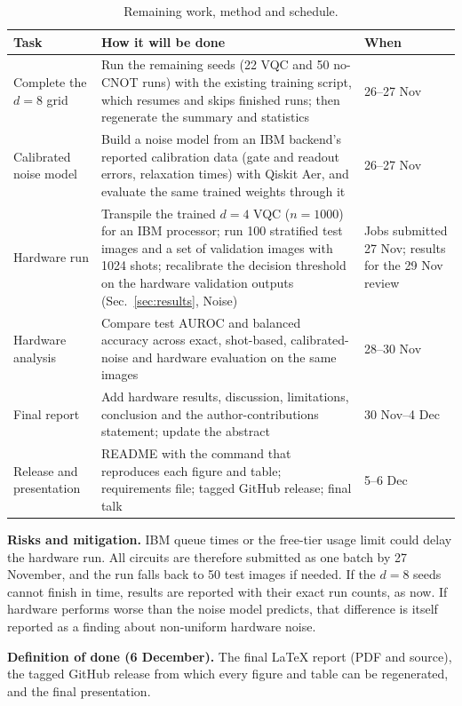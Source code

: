 \documentclass[conference]{IEEEtran}
\begin{document}
\begin{table}[t]
\centering
\caption{Remaining work, method and schedule.}
\label{tab:todo}
\footnotesize
\begin{tabular}{@{}p{}p{}p{}@{}}
\toprule
Task & How it will be done & When \\
\midrule
Complete the $d=8$ grid & Run the remaining seeds (22 VQC and 50 no-CNOT runs) with the existing training script, which resumes and skips finished runs; then regenerate the summary and statistics & 26--27 Nov \\
Calibrated noise model & Build a noise model from an IBM backend's reported calibration data (gate and readout errors, relaxation times) with Qiskit Aer, and evaluate the same trained weights through it & 26--27 Nov \\
Hardware run & Transpile the trained $d=4$ VQC ($n=1000$) for an IBM processor; run 100 stratified test images and a set of validation images with 1024 shots; recalibrate the decision threshold on the hardware validation outputs (Sec.~\ref{sec:results}, Noise) & Jobs submitted 27 Nov; results for the 29 Nov review \\
Hardware analysis & Compare test AUROC and balanced accuracy across exact, shot-based, calibrated-noise and hardware evaluation on the same images & 28--30 Nov \\
Final report & Add hardware results, discussion, limitations, conclusion and the author-contributions statement; update the abstract & 30 Nov--4 Dec \\
Release and presentation & README with the command that reproduces each figure and table; requirements file; tagged GitHub release; final talk & 5--6 Dec \\
\bottomrule
\end{tabular}
\end{table}

\textbf{Risks and mitigation.} IBM queue times or the free-tier usage
limit could delay the hardware run. All circuits are therefore submitted
as one batch by 27 November, and the run falls back to 50 test images if
needed. If the $d=8$ seeds cannot finish in time, results are reported
with their exact run counts, as now. If hardware performs worse than the
noise model predicts, that difference is itself reported as a finding
about non-uniform hardware noise.

\textbf{Definition of done (6 December).} The final LaTeX report (PDF and
source), the tagged GitHub release from which every figure and table can
be regenerated, and the final presentation.
\end{document}
